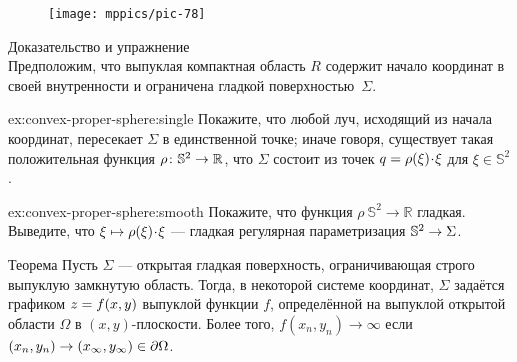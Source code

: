 {

\begin{figure}
\vskip-8mm
\centering
\texttt{[image: mppics/pic-78]}
\end{figure}

\begin{thm}{Доказательство и упражнение}\label{ex:convex-proper-sphere}\\
Предположим, что выпуклая компактная область $R$ содержит начало координат в своей внутренности и ограничена гладкой поверхностью~$\Sigma$.

\begin{subthm}{ex:convex-proper-sphere:single}
Покажите, что любой луч, исходящий из начала координат, пересекает $\Sigma$ в единственной точке;
иначе говоря, существует такая положительная функция $\rho\:\mathbb{S}^2\z\to\mathbb{R}$, что $\Sigma$ состоит из точек $q\z=\rho(\xi)\cdot \xi$ для $\xi\in \mathbb{S}^2$.
\end{subthm}

\begin{subthm}{ex:convex-proper-sphere:smooth}
Покажите, что функция $\rho\:\mathbb{S}^2\to\mathbb{R}$ гладкая.
Выведите, что $\xi\z\mapsto \rho(\xi)\cdot \xi$ --- гладкая регулярная параметризация $\mathbb{S}^2\z\to \Sigma$.
\end{subthm}

\end{thm}

}



\begin{thm}{Теорема}\label{thm:convex-open}
Пусть $\Sigma$ --- открытая гладкая поверхность, ограничивающая строго выпуклую замкнутую область.
Тогда, в некоторой системе координат, $\Sigma$ задаётся графиком $z\z=f(x,y)$ выпуклой функции $f$, определённой на выпуклой открытой области $\Omega$ в $(x,y)$-плоскости.
Более того, $f(x_n,y_n)\to\infty$ если $(x_n,y_n)\to(x_\infty,y_\infty)\z\in \partial\Omega$.

\end{thm}

